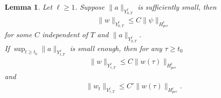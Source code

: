 \documentclass[10pt,a4paper,final]{article}
\numberwithin{equation}{section}
\newtheorem{lemma}[theorem]{Lemma}
\begin{document}
\begin{lemma}\label{aprieqap1}
    Let $\ell\geq 1$. Suppose $\|a\|_{Y^{\ell}_{0,T}}$ is sufficiently small, then 
    \begin{align}\label{w_l1}
        \|w\|_{Y^{\ell}_{0,T}}\leq C\|\psi\|_{H^{\ell}_{per}}
    \end{align}
    for some $C$ independent of $T$ and $\|a\|_{Y^{\ell}_{0,T}}$.\\

    If $\sup_{t\geq t_0}\|a\|_{Y^{\ell}_{t,T}}$ is small enough, then for any $\tau\geq t_0$
   \begin{align} \label{WYtauTtoWtau}
       \|w\|_{Y^{\ell}_{\tau,T}}\leq C\|w(\tau)\|_{H^{\ell}_{per}}
   \end{align}
   and
      \begin{align} \label{WtYtauTtoWtau}
       \|w_t\|_{Y^{\ell}_{\tau,T}}\leq C'\|w(\tau)\|_{H^{\ell}_{per}}.
   \end{align}
\end{lemma}
\end{document}
